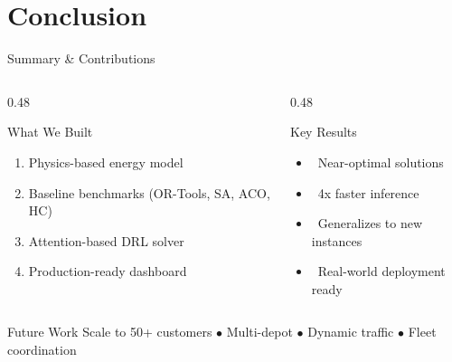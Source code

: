 \documentclass[aspectratio=169,11pt]{beamer}
\newcommand{\cmark}{\ding{51}}
\begin{document}
\section{Conclusion}

\begin{frame}{Summary \& Contributions}
    \begin{columns}[T]
        \begin{column}{0.48\textwidth}
            \begin{block}{What We Built}
                \begin{enumerate}
                    \item Physics-based energy model
                    \item Baseline benchmarks (OR-Tools, SA, ACO, HC)
                    \item Attention-based DRL solver
                    \item Production-ready dashboard
                \end{enumerate}
            \end{block}
        \end{column}
        \begin{column}{0.48\textwidth}
            \begin{block}{Key Results}
                \begin{itemize}
                    \item \cmark~Near-optimal solutions
                    \item \cmark~4x faster inference
                    \item \cmark~Generalizes to new instances
                    \item \cmark~Real-world deployment ready
                \end{itemize}
            \end{block}
        \end{column}
    \end{columns}

    \vspace{0.4cm}
    \begin{exampleblock}{Future Work}
        \centering
        Scale to 50+ customers $\bullet$ Multi-depot $\bullet$ Dynamic traffic $\bullet$ Fleet coordination
    \end{exampleblock}
\end{frame}
\end{document}
